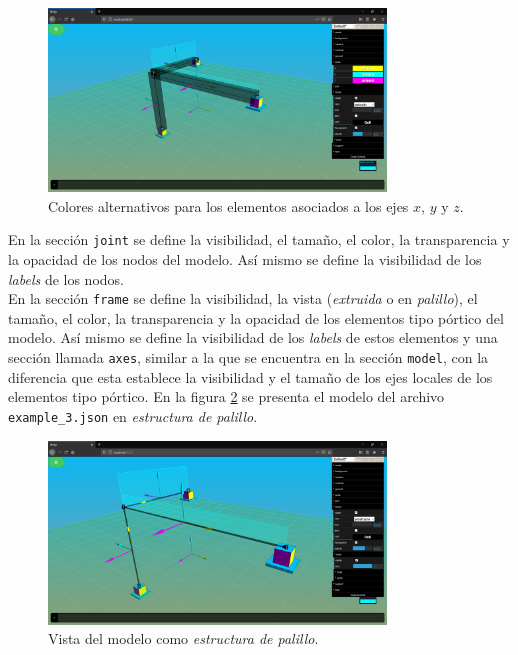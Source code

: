 \begin{figure}[ht]
  \centering
  \includegraphics[width=0.8\textwidth]{introduction/dat-gui-axes.png}
  \caption{Colores alternativos para los elementos asociados a los ejes $ x $, $ y $ y $ z $.}
  \label{fig:dat.gui-axes}
\end{figure}

En la sección \verb|joint| se define la visibilidad, el tamaño, el color, la transparencia y la opacidad de los nodos del modelo. Así mismo se define la visibilidad de los \emph{labels} de los nodos.\\

En la sección \verb|frame| se define la visibilidad, la vista (\emph{extruida} o en \emph{palillo}), el tamaño, el color, la transparencia y la opacidad de los elementos tipo pórtico del modelo. Así mismo se define la visibilidad de los \emph{labels} de estos elementos y una sección llamada \verb|axes|, similar a la que se encuentra en la sección \verb|model|, con la diferencia que esta establece la visibilidad y el tamaño de los ejes locales de los elementos tipo pórtico. En la figura \ref{fig:dat.gui-frame} se presenta el modelo del archivo \verb|example_3.json| en \emph{estructura de palillo}.\\

\begin{figure}[ht]
  \centering
  \includegraphics[width=0.8\textwidth]{introduction/dat-gui-frame.png}
  \caption{Vista del modelo como \emph{estructura de palillo}.}
  \label{fig:dat.gui-frame}
\end{figure}

